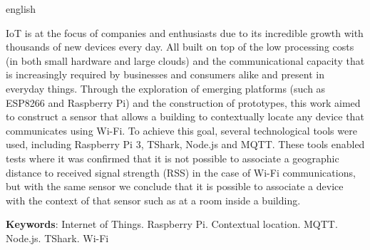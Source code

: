 \begin{resumo}[Abstract]
\begin{otherlanguage*}{english}

	IoT is at the focus of companies and enthusiasts due to its incredible
	growth with thousands of new devices every day. All built on top of the low
	processing costs (in both small hardware and large clouds) and the
	communicational capacity that is increasingly required by businesses and
	consumers alike and present in everyday things.
	Through the exploration of emerging platforms (such as ESP8266 and Raspberry
	Pi) and the construction of prototypes, this work aimed to construct a
	sensor that allows a building to contextually locate any device that
	communicates using Wi-Fi.
	To achieve this goal, several technological tools were used, including
	Raspberry Pi 3, TShark, Node.js and MQTT. These tools enabled tests where it
	was confirmed that it is not possible to associate a geographic distance to
	received signal strength (RSS) in the case of Wi-Fi communications, but
	with the same sensor we conclude that it is possible to associate a device
	with the context of that sensor such as at a room inside a building.

	\textbf{Keywords}: Internet of Things. Raspberry Pi. Contextual location. MQTT. Node.js. TShark. Wi-Fi
\end{otherlanguage*}
\end{resumo}
